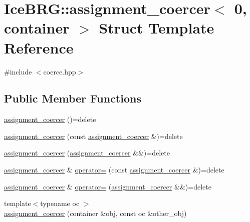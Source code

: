 \hypertarget{structIceBRG_1_1assignment__coercer_3_010_00_01container_01_4}{}\section{Ice\+B\+R\+G\+:\+:assignment\+\_\+coercer$<$ 0, container $>$ Struct Template Reference}
\label{structIceBRG_1_1assignment__coercer_3_010_00_01container_01_4}


{\ttfamily \#include $<$coerce.\+hpp$>$}

\subsection*{Public Member Functions}
\begin{DoxyCompactItemize}
\item 
\hyperlink{structIceBRG_1_1assignment__coercer_3_010_00_01container_01_4_a0f622fef256976a0cd4d6726f7fcd0b3}{assignment\+\_\+coercer} ()=delete
\item 
\hyperlink{structIceBRG_1_1assignment__coercer_3_010_00_01container_01_4_a275c83e135f0b5deb04e4f95652865b6}{assignment\+\_\+coercer} (const \hyperlink{structIceBRG_1_1assignment__coercer}{assignment\+\_\+coercer} \&)=delete
\item 
\hyperlink{structIceBRG_1_1assignment__coercer_3_010_00_01container_01_4_ab866af07befe8f3ddd8b07c55d549ae5}{assignment\+\_\+coercer} (\hyperlink{structIceBRG_1_1assignment__coercer}{assignment\+\_\+coercer} \&\&)=delete
\item 
\hyperlink{structIceBRG_1_1assignment__coercer}{assignment\+\_\+coercer} \& \hyperlink{structIceBRG_1_1assignment__coercer_3_010_00_01container_01_4_a7929ca93d78b599cf32b9416b0241348}{operator=} (const \hyperlink{structIceBRG_1_1assignment__coercer}{assignment\+\_\+coercer} \&)=delete
\item 
\hyperlink{structIceBRG_1_1assignment__coercer}{assignment\+\_\+coercer} \& \hyperlink{structIceBRG_1_1assignment__coercer_3_010_00_01container_01_4_a4f4dd698ea56ad9b0215b306d73acdb2}{operator=} (\hyperlink{structIceBRG_1_1assignment__coercer}{assignment\+\_\+coercer} \&\&)=delete
\item 
{\footnotesize template$<$typename oc $>$ }\\\hyperlink{structIceBRG_1_1assignment__coercer_3_010_00_01container_01_4_a923bafa9af6f885bd297962fff6c9ed4}{assignment\+\_\+coercer} (container \&obj, const oc \&other\+\_\+obj)
\end{DoxyCompactItemize}


